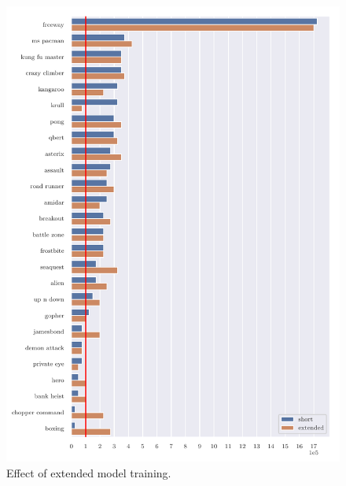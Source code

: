 \begin{figure}
\centering
\includegraphics[width=0.9\columnwidth]{figures/graph_Effect_of_extended_model_training.pdf}
\caption{Effect of extended model training.}
\label{fig:comp_long_train}
\end{figure}

